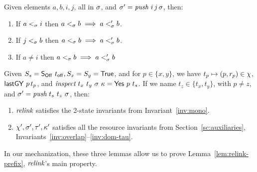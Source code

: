 \begin{lemma}\label{lem:push-mono}
Given elements $a, b, i, j$, all in $\sigma$, and $\sigma' =
\textit{push}\ i\, j\, \sigma$, then:
\begin{enumerate}
\item\label{lem:push:left} If $a \mathrel{<_\sigma} i$ then $ a \mathrel{<_\sigma} b \implies a
  \mathrel{<_\sigma'} b$.
\item\label{lem:push:right} If $j \mathrel{<_\sigma} b$ then $ a \mathrel{<_\sigma} b \implies a
  \mathrel{<_\sigma'} b $.
\item\label{lem:push:window} If $a \neq i$ then $ a \mathrel{<_\sigma} b \implies a
  \mathrel{<_\sigma'} b $
\end{enumerate}
\end{lemma}



\begin{lemma}\label{lem:push}
Given $S_s = \mathsf{S_{Off}}\ t_{\mathsf{off}}, S_x = S_y =\mathsf{True}$, and for $p \in \{x,y\}$,
we have $t_p \mapsto (p, r_p) \in \chi$, $ \mathsf{lastGY}\ p\, t_p$, and
{$\aux{inspect}\ t_x\ t_y\ \ordlist\ \C = {\sf Yes}\ p\ t_s$}. If we
name $t_z \in \{ t_x, t_y\}$, with $p \neq z$, and $\sigma' =
\textit{push}\ t_s\ t_z\ \sigma$, then:
\begin{enumerate}
 \item $\textit{relink}$ satisfies the 2-state invariants from
   Invariant~\ref{inv:mono}.
\item $\chi', \sigma', \tau', \kappa'$ satisfies all the resource
  invariants from Section~\ref{sc:auxiliaries}, \ie
  Invariants~\ref{inv:overlap}--\ref{inv:dom-tau}.
\end{enumerate}
\end{lemma}

In our mechanization, these three lemmas allow us to prove
Lemma~\ref{lem:relink-prefix}, $\textit{relink}$'s main property.
